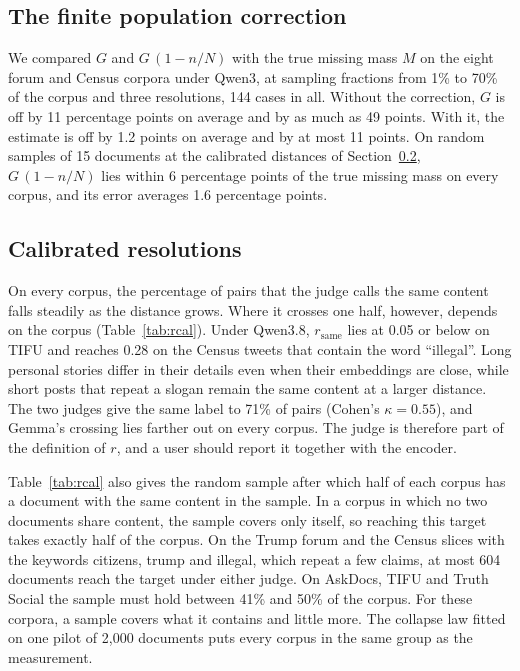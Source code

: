 \subsection{The finite population correction}
\label{sec:fpc}

We compared $G$ and $G\,(1 - n/N)$ with the true missing mass $M$ on the eight forum and Census corpora under Qwen3, at sampling fractions from 1\% to 70\% of the corpus and three resolutions, 144 cases in all. Without the correction, $G$ is off by 11 percentage points on average and by as much as 49 points. With it, the estimate is off by 1.2 points on average and by at most 11 points. On random samples of 15 documents at the calibrated distances of Section~\ref{sec:rcal}, $G\,(1-n/N)$ lies within 6 percentage points of the true missing mass on every corpus, and its error averages 1.6 percentage points.

\subsection{Calibrated resolutions}
\label{sec:rcal}

On every corpus, the percentage of pairs that the judge calls the same content falls steadily as the distance grows. Where it crosses one half, however, depends on the corpus (Table~\ref{tab:rcal}). Under Qwen3.8, $r_{\mathrm{same}}$ lies at 0.05 or below on TIFU and reaches 0.28 on the Census tweets that contain the word ``illegal''. Long personal stories differ in their details even when their embeddings are close, while short posts that repeat a slogan remain the same content at a larger distance. The two judges give the same label to 71\% of pairs (Cohen's $\kappa = 0.55$), and Gemma's crossing lies farther out on every corpus. The judge is therefore part of the definition of $r$, and a user should report it together with the encoder.



Table~\ref{tab:rcal} also gives the random sample after which half of each corpus has a document with the same content in the sample. In a corpus in which no two documents share content, the sample covers only itself, so reaching this target takes exactly half of the corpus. On the Trump forum and the Census slices with the keywords citizens, trump and illegal, which repeat a few claims, at most 604 documents reach the target under either judge. On AskDocs, TIFU and Truth Social the sample must hold between 41\% and 50\% of the corpus. For these corpora, a sample covers what it contains and little more. The collapse law fitted on one pilot of 2{,}000 documents puts every corpus in the same group as the measurement.

